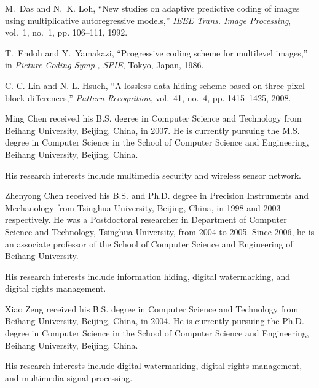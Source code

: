 \documentclass[journal]{IEEEtran}
\begin{document}
\begin{thebibliography}{10}
M.~Das and N.~K. Loh, ``New studies on adaptive predictive coding of images
  using multiplicative autoregressive models,'' \emph{IEEE Trans. Image
  Processing}, vol.~1, no.~1, pp. 106--111, 1992.

T.~Endoh and Y.~Yamakazi, ``Progressive coding scheme for multilevel images,''
  in \emph{Picture Coding Symp., SPIE}, Tokyo, Japan, 1986.

C.-C. Lin and N.-L. Hsueh, ``A lossless data hiding scheme based on three-pixel
  block differences,'' \emph{Pattern Recognition}, vol.~41, no.~4, pp.
  1415--1425, 2008.

\end{thebibliography}

\vspace*{-2\baselineskip}
\begin{IEEEbiography}{Ming Chen}
    received his B.S. degree in Computer Science and Technology from Beihang University, Beijing,
    China, in 2007. He is currently pursuing the M.S. degree in Computer Science in the School
    of Computer Science and Engineering, Beihang University, Beijing, China. 

    His research interests include multimedia security and wireless sensor network.
\end{IEEEbiography}
\vspace*{-2\baselineskip}

\begin{IEEEbiography}{Zhenyong Chen}
    received his B.S. and Ph.D. degree in Precision Instruments and Mechanology from Tsinghua
    University, Beijing, China, in 1998 and 2003 respectively. He was a Postdoctoral researcher in
    Department of Computer Science and Technology, Tsinghua University, from 2004 to 2005. Since
    2006, he is an associate professor of the School of Computer Science and Engineering of Beihang
    University. 
    
    His research interests include information hiding, digital watermarking, and digital rights
    management.
\end{IEEEbiography}

\vspace*{-2\baselineskip}

\begin{IEEEbiography}{Xiao Zeng}
    received his B.S. degree in Computer Science and Technology from Beihang University, Beijing,
    China, in 2004. He is currently pursuing the Ph.D. degree in Computer Science in the School
    of Computer Science and Engineering, Beihang University, Beijing, China.

    His research interests include digital watermarking, digital rights management, and multimedia
    signal processing.
\end{IEEEbiography}
\vspace*{-2\baselineskip}
\end{document}
